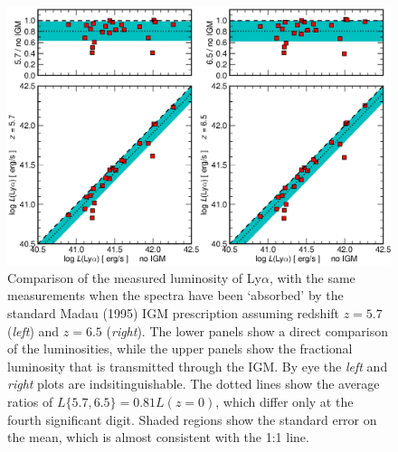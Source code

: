 \documentclass[manuscript]{emulateapj}
\newcommand{\lya}{Ly$\alpha$}
\begin{document}
\begin{figure}[t!]
   \centering
   \includegraphics[scale=.65]{lumcomp_igm.eps}
   \caption{Comparison of the measured luminosity of \lya, with the same measurements 
	when the spectra have been `absorbed' by the standard Madau (1995) IGM  prescription
	 assuming redshift $z=5.7$ (\emph{left}) and $z=6.5$ (\emph{right}). The lower panels
	 show a direct comparison of the luminosities, while the upper panels show the 
	 fractional luminosity that is transmitted through the IGM. By eye the \emph{left} 
	and \emph{right} plots are indsitinguishable. The dotted lines show the average 
	ratios of $L\{5.7,6.5\} = 0.81L(z=0)$, which differ only at the fourth significant 
  digit. Shaded regions show the standard error on the mean, which is almost consistent
	with the 1:1 line. 
\vspace{5mm}	 }
   \label{fig:igmlum}
\end{figure}
\end{document}
